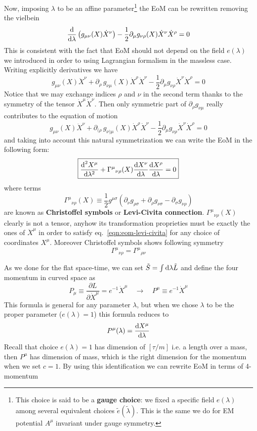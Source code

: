 \documentclass[../main/main.tex]{subfiles}
\begin{document}
Now, imposing $\lambda$ to be an affine parameter\footnote{This choice is said to be a \textbf{gauge choice}: we fixed a specific field $e(\lambda)$ among several equivalent choices $\tilde e(\tilde\lambda)$. This is the same we do for EM potential $A^\mu$ invariant under gauge symmetry.} the EoM can be rewritten removing the vielbein
\[
\frac{\textup{d}}{\textup{d}\lambda}\left(g_{\mu\nu}(X)\dot X^\nu\right)-\frac12\partial_\mu g_{\nu\rho}(X)\dot X^\nu\dot X^\rho=0
\]
This is consistent with the fact that EoM should not depend on the field $e(\lambda)$ we introduced in order to using Lagrangian formalism in the massless case. Writing explicitly derivatives we have
\[g_{\mu\nu}(X)\ddot X^\nu+\partial_\rho \,g_{\nu\mu}(X)\dot X^\rho\dot X^\nu-\frac12\partial_\mu g_{\nu\rho}\dot X^\nu\dot X^\rho=0\]
Notice that we may exchange indices $\rho$ and $\nu$ in the second term thanks to the symmetry of the tensor $\dot X^\mu\dot X^\nu$. Then only symmetric part of $\partial_\rho g_{\nu\mu}$ really contributes to the equation of motion
\[g_{\mu\nu}(X)\ddot X^\nu+\partial_{(\rho} \,g_{\nu)\mu}(X)\dot X^\rho\dot X^\nu-\frac12\partial_\mu g_{\nu\rho}\dot X^\nu\dot X^\rho=0\]
and taking into account this natural symmetrization we can write the EoM in the following form:
\begin{equation}\label{eqn:eom-levi-civita}
\boxed{
\frac{\textup{d}^2X^\mu}{\textup{d}\lambda^2}+{\Gamma^\mu}_{\nu\rho}(X)\frac{\textup{d} X^\nu}{\textup{d}\lambda}\frac{\textup{d} X^\rho}{\textup{d}\lambda}=0
}
\end{equation}
where terms
\begin{equation}
\boxed{
{\Gamma^\mu}_{\nu\rho}(X)\equiv\frac12g^{\mu\sigma}(\partial_\nu g_{\rho\sigma}+\partial_\rho g_{\nu\sigma}-\partial_\sigma g_{\nu\rho})
}
\end{equation}
are known as \textbf{Christoffel symbols} or \textbf{Levi-Civita connection}.  ${\Gamma^\mu}_{\nu\rho}(X)$ clearly is not a tensor, anyhow its transformation proprieties must be exactly the ones of $\ddot X^\mu$ in order to satisfy eq.~\eqref{eqn:eom-levi-civita} for any choice of coordinates $X^\mu$. Moreover Christoffel symbols shows following symmetry
\[{\Gamma^\mu}_{\nu\rho}={\Gamma^\mu}_{\rho\nu}\]

As we done for the flat space-time, we can set $\tilde S=\int\textup{d}\lambda\tilde L$ and define the four momentum in curved space as
\begin{equation}
P_\mu\equiv\frac{\partial L}{\partial \dot X^\mu}=e^{-1}\dot X^\mu\quad\rightarrow\quad P^\mu \equiv e^{-1}\dot X^\mu
\end{equation}
This formula is general for any parameter $\lambda$, but when we chose $\lambda$ to be the proper parameter ($e(\lambda)=1$) this formula reduces to 
\[P^\mu(\lambda)=\frac{\textup{d} X^\mu}{\textup{d}\lambda}\]
Recall that choice $e(\lambda)=1$ has dimension of $[\tau/m]$ i.e. a length over a mass, then $P^\mu$ has dimension of mass, which is the right dimension for the momentum when we set $c=1$.
By using this identification we can rewrite EoM in terms of 4-momentum
\end{document}
